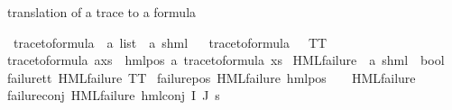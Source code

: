 \begin{isabellebody}
\begin{isamarkuptext}
translation of a trace to a formula%
\end{isamarkuptext}\isamarkuptrue%
\isamarkupfalse%
\ trace{\isacharunderscore}{\kern0pt}to{\isacharunderscore}{\kern0pt}formula\ {\isacharcolon}{\kern0pt}{\isacharcolon}{\kern0pt}\ {\isachardoublequoteopen}{\isacharprime}{\kern0pt}a\ list\ {\isasymRightarrow}\ {\isacharparenleft}{\kern0pt}{\isacharprime}{\kern0pt}a{\isacharcomma}{\kern0pt}\ {\isacharprime}{\kern0pt}s{\isacharparenright}{\kern0pt}hml{\isachardoublequoteclose}\isanewline
\ \ \isanewline
{\isachardoublequoteopen}trace{\isacharunderscore}{\kern0pt}to{\isacharunderscore}{\kern0pt}formula\ {\isacharbrackleft}{\kern0pt}{\isacharbrackright}{\kern0pt}\ {\isacharequal}{\kern0pt}\ TT{\isachardoublequoteclose}\ {\isacharbar}{\kern0pt}\isanewline
{\isachardoublequoteopen}trace{\isacharunderscore}{\kern0pt}to{\isacharunderscore}{\kern0pt}formula\ {\isacharparenleft}{\kern0pt}a{\isacharhash}{\kern0pt}xs{\isacharparenright}{\kern0pt}\ {\isacharequal}{\kern0pt}\ hml{\isacharunderscore}{\kern0pt}pos\ a\ {\isacharparenleft}{\kern0pt}trace{\isacharunderscore}{\kern0pt}to{\isacharunderscore}{\kern0pt}formula\ xs{\isacharparenright}{\kern0pt}{\isachardoublequoteclose}\isanewline
\isanewline
{}\isamarkupfalse%
\ HML{\isacharunderscore}{\kern0pt}failure\ {\isacharcolon}{\kern0pt}{\isacharcolon}{\kern0pt}\ {\isachardoublequoteopen}{\isacharparenleft}{\kern0pt}{\isacharprime}{\kern0pt}a{\isacharcomma}{\kern0pt}\ {\isacharprime}{\kern0pt}s{\isacharparenright}{\kern0pt}hml\ {\isasymRightarrow}\ bool{\isachardoublequoteclose}\isanewline
\ \ \isanewline
failure{\isacharunderscore}{\kern0pt}tt{\isacharcolon}{\kern0pt}\ {\isachardoublequoteopen}HML{\isacharunderscore}{\kern0pt}failure\ TT{\isachardoublequoteclose}\ {\isacharbar}{\kern0pt}\isanewline
failure{\isacharunderscore}{\kern0pt}pos{\isacharcolon}{\kern0pt}\ {\isachardoublequoteopen}HML{\isacharunderscore}{\kern0pt}failure\ {\isacharparenleft}{\kern0pt}hml{\isacharunderscore}{\kern0pt}pos\ {\isasymalpha}\ {\isasymphi}{\isacharparenright}{\kern0pt}{\isachardoublequoteclose}\ \ {\isachardoublequoteopen}HML{\isacharunderscore}{\kern0pt}failure\ {\isasymphi}{\isachardoublequoteclose}\ {\isacharbar}{\kern0pt}\isanewline
failure{\isacharunderscore}{\kern0pt}conj{\isacharcolon}{\kern0pt}\ {\isachardoublequoteopen}HML{\isacharunderscore}{\kern0pt}failure\ {\isacharparenleft}{\kern0pt}hml{\isacharunderscore}{\kern0pt}conj\ I\ J\ {\isasympsi}s{\isacharparenright}{\kern0pt}{\isachardoublequoteclose}\ \isanewline

\end{isabellebody}
